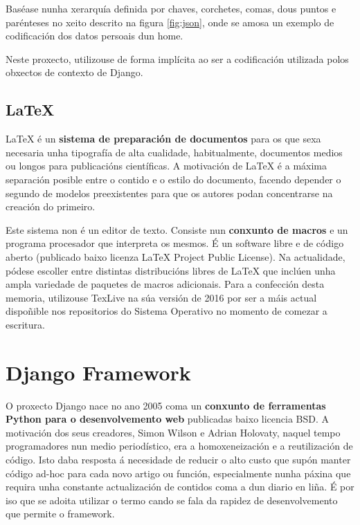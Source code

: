 Baséase nunha xerarquía definida por chaves, corchetes, comas, dous puntos e parénteses no xeito descrito na figura \ref{fig:json}, onde se amosa un exemplo de codificación dos datos persoais dun home.

Neste proxecto, utilizouse de forma implícita ao ser a codificación utilizada polos obxectos de contexto de Django.

\subsection{LaTeX}
\label{latex}

LaTeX é un \textbf{sistema de preparación de documentos} para os que sexa necesaria unha tipografía de alta cualidade, habitualmente, documentos medios ou longos para publicacións científicas. A motivación de LaTeX é a máxima separación posible entre o contido e o estilo do documento, facendo depender o segundo de modelos preexistentes para que os autores podan concentrarse na creación do primeiro.

Este sistema non é un editor de texto. Consiste nun \textbf{conxunto de macros} e un programa procesador que interpreta os mesmos. É un software libre e de código aberto (publicado baixo licenza  LaTeX Project Public License\cite{latex}). Na actualidade, pódese escoller entre distintas  distribucións libres de LaTeX que inclúen unha ampla variedade de paquetes de macros adicionais. Para a confección desta memoria, utilizouse TexLive na súa versión de 2016 por ser a máis actual dispoñible nos repositorios do Sistema Operativo no momento de comezar a escritura.






\section{Django Framework}
\label{django}
O proxecto Django nace no ano 2005 coma un \textbf{conxunto de ferramentas Python para o desenvolvemento web} publicadas
baixo licencia BSD. A motivación dos seus creadores, Simon Wilson e Adrian Holovaty, naquel tempo programadores
nun medio periodístico, era a homoxeneización e a reutilización de código. Isto daba resposta á necesidade de reducir
o alto custo que supón manter código ad-hoc para cada novo artigo ou función, especialmente nunha páxina que
requira unha constante actualización de contidos coma a dun diario en liña. É por iso que se adoita utilizar o 
termo  cando se fala da rapidez de desenvolvemento que permite o framework\cite{django1}.  

